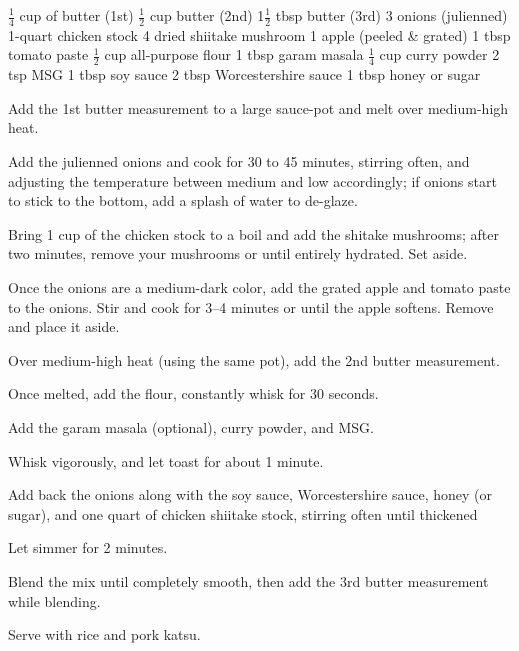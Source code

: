 \dishtype{\sauce}
\dishother{\vegetarian}
\begin{ingreds}
    $\frac{1}{4}$ cup of butter (1st)
	$\frac{1}{2}$ cup butter (2nd)
	1$\frac{1}{2}$ tbsp butter (3rd)
	3 onions (julienned)
	1-quart chicken stock
	4 dried shiitake mushroom 
	1 apple (peeled \& grated)
	1 tbsp tomato paste
	$\frac{1}{2}$ cup all-purpose flour
	1 tbsp garam masala
	$\frac{1}{4}$ cup curry powder
	2 tsp MSG
	1 tbsp soy sauce
	2 tbsp Worcestershire sauce
	1 tbsp honey or sugar        
\end{ingreds}
\begin{method}
    Add the 1st butter measurement to a large sauce-pot and melt over medium-high heat.\par
    Add the julienned onions and cook for 30 to 45 minutes, stirring often, and adjusting the temperature between medium and low accordingly; if onions start to stick to the bottom, add a splash of water to de-glaze.\par
	Bring 1 cup of the chicken stock to a boil and add the shitake mushrooms; after two minutes, remove your mushrooms or until entirely hydrated. Set aside.\par
    Once the onions are a medium-dark color, add the grated apple and tomato paste to the onions. Stir and cook for 3--4 minutes or until the apple softens. Remove and place it aside.\par
	Over medium-high heat (using the same pot),  add the 2nd butter measurement.\par
    Once melted, add the flour, constantly whisk for 30 seconds.\par
    Add the garam masala (optional), curry powder, and MSG.\par
    Whisk vigorously, and let toast for about 1 minute.\par
	Add back the onions along with the soy sauce, Worcestershire sauce, honey (or sugar), and one quart of chicken shiitake stock, stirring often until thickened\par
    Let simmer for 2 minutes.\par
	Blend the mix until completely smooth, then add the 3rd butter measurement while blending.\par
    Serve with rice and pork katsu.
\end{method}